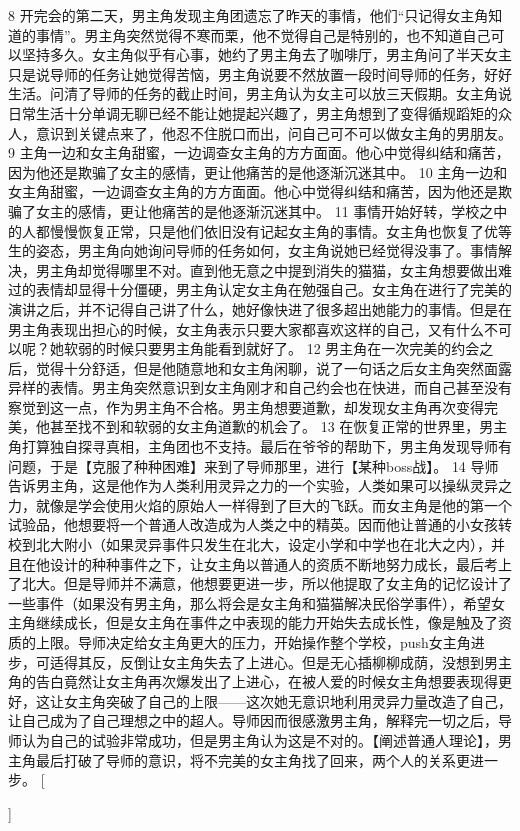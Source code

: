 {{{        }
        {8}{
            开完会的第二天，男主角发现主角团遗忘了昨天的事情，他们“只记得女主角知道的事情”。男主角突然觉得不寒而栗，他不觉得自己是特别的，也不知道自己可以坚持多久。女主角似乎有心事，她约了男主角去了咖啡厅，男主角问了半天女主只是说导师的任务让她觉得苦恼，男主角说要不然放置一段时间导师的任务，好好生活。问清了导师的任务的截止时间，男主角认为女主可以放三天假期。女主角说日常生活十分单调无聊已经不能让她提起兴趣了，男主角想到了变得循规蹈矩的众人，意识到关键点来了，他忍不住脱口而出，问自己可不可以做女主角的男朋友。
        }
        {9}{
            主角一边和女主角甜蜜，一边调查女主角的方方面面。他心中觉得纠结和痛苦，因为他还是欺骗了女主的感情，更让他痛苦的是他逐渐沉迷其中。
        }
        {10}{
            主角一边和女主角甜蜜，一边调查女主角的方方面面。他心中觉得纠结和痛苦，因为他还是欺骗了女主的感情，更让他痛苦的是他逐渐沉迷其中。
        }
        {11}{
            事情开始好转，学校之中的人都慢慢恢复正常，只是他们依旧没有记起女主角的事情。女主角也恢复了优等生的姿态，男主角向她询问导师的任务如何，女主角说她已经觉得没事了。事情解决，男主角却觉得哪里不对。直到他无意之中提到消失的猫猫，女主角想要做出难过的表情却显得十分僵硬，男主角认定女主角在勉强自己。女主角在进行了完美的演讲之后，并不记得自己讲了什么，她好像快进了很多超出她能力的事情。但是在男主角表现出担心的时候，女主角表示只要大家都喜欢这样的自己，又有什么不可以呢？她软弱的时候只要男主角能看到就好了。
        }
        {12}{
            男主角在一次完美的约会之后，觉得十分舒适，但是他随意地和女主角闲聊，说了一句话之后女主角突然面露异样的表情。男主角突然意识到女主角刚才和自己约会也在快进，而自己甚至没有察觉到这一点，作为男主角不合格。男主角想要道歉，却发现女主角再次变得完美，他甚至找不到和软弱的女主角道歉的机会了。
        }
        {13}{
            在恢复正常的世界里，男主角打算独自探寻真相，主角团也不支持。最后在爷爷的帮助下，男主角发现导师有问题，于是【克服了种种困难】来到了导师那里，进行【某种boss战】。
        }
        {14}{
            导师告诉男主角，这是他作为人类利用灵异之力的一个实验，人类如果可以操纵灵异之力，就像是学会使用火焰的原始人一样得到了巨大的飞跃。而女主角是他的第一个试验品，他想要将一个普通人改造成为人类之中的精英。因而他让普通的小女孩转校到北大附小（如果灵异事件只发生在北大，设定小学和中学也在北大之内），并且在他设计的种种事件之下，让女主角以普通人的资质不断地努力成长，最后考上了北大。但是导师并不满意，他想要更进一步，所以他提取了女主角的记忆设计了一些事件（如果没有男主角，那么将会是女主角和猫猫解决民俗学事件），希望女主角继续成长，但是女主角在事件之中表现的能力开始失去成长性，像是触及了资质的上限。导师决定给女主角更大的压力，开始操作整个学校，push女主角进步，可适得其反，反倒让女主角失去了上进心。但是无心插柳柳成荫，没想到男主角的告白竟然让女主角再次爆发出了上进心，在被人爱的时候女主角想要表现得更好，这让女主角突破了自己的上限——这次她无意识地利用灵异力量改造了自己，让自己成为了自己理想之中的超人。导师因而很感激男主角，解释完一切之后，导师认为自己的试验非常成功，但是男主角认为这是不对的。【阐述普通人理论】，男主角最后打破了导师的意识，将不完美的女主角找了回来，两个人的关系更进一步。
        }
    }[\PackageError{tree}{Undefined option to tree: #1}{}]%
}